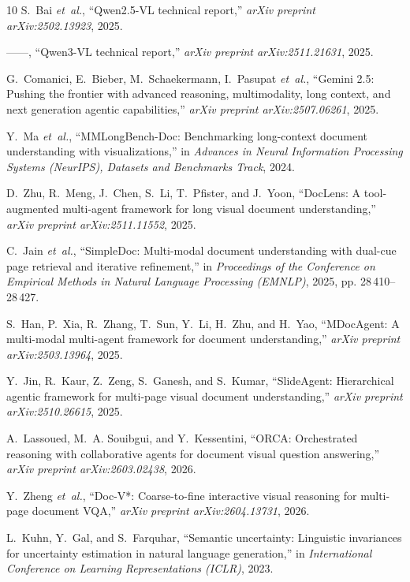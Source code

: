 \documentclass[pdflatex,sn-basic]{sn-jnl}%
\theoremstyle{thmstyletwo}%
\begin{document}
\begin{thebibliography}{10}
S.~Bai \emph{et~al.}, ``{Qwen2.5-VL} technical report,'' \emph{arXiv preprint
  arXiv:2502.13923}, 2025.

------, ``{Qwen3-VL} technical report,'' \emph{arXiv preprint
  arXiv:2511.21631}, 2025.

G.~Comanici, E.~Bieber, M.~Schaekermann, I.~Pasupat \emph{et~al.}, ``Gemini
  2.5: Pushing the frontier with advanced reasoning, multimodality, long
  context, and next generation agentic capabilities,'' \emph{arXiv preprint
  arXiv:2507.06261}, 2025.

Y.~Ma \emph{et~al.}, ``{MMLongBench-Doc}: Benchmarking long-context document
  understanding with visualizations,'' in \emph{Advances in Neural Information
  Processing Systems (NeurIPS), Datasets and Benchmarks Track}, 2024.

D.~Zhu, R.~Meng, J.~Chen, S.~Li, T.~Pfister, and J.~Yoon, ``{DocLens}: A
  tool-augmented multi-agent framework for long visual document
  understanding,'' \emph{arXiv preprint arXiv:2511.11552}, 2025.

C.~Jain \emph{et~al.}, ``{SimpleDoc}: Multi-modal document understanding with
  dual-cue page retrieval and iterative refinement,'' in \emph{Proceedings of
  the Conference on Empirical Methods in Natural Language Processing (EMNLP)},
  2025, pp. 28\,410--28\,427.

S.~Han, P.~Xia, R.~Zhang, T.~Sun, Y.~Li, H.~Zhu, and H.~Yao, ``{MDocAgent}: A
  multi-modal multi-agent framework for document understanding,'' \emph{arXiv
  preprint arXiv:2503.13964}, 2025.

Y.~Jin, R.~Kaur, Z.~Zeng, S.~Ganesh, and S.~Kumar, ``{SlideAgent}: Hierarchical
  agentic framework for multi-page visual document understanding,'' \emph{arXiv
  preprint arXiv:2510.26615}, 2025.

A.~Lassoued, M.~A. Souibgui, and Y.~Kessentini, ``{ORCA}: Orchestrated
  reasoning with collaborative agents for document visual question answering,''
  \emph{arXiv preprint arXiv:2603.02438}, 2026.

Y.~Zheng \emph{et~al.}, ``{Doc-V*}: Coarse-to-fine interactive visual reasoning
  for multi-page document {VQA},'' \emph{arXiv preprint arXiv:2604.13731},
  2026.

L.~Kuhn, Y.~Gal, and S.~Farquhar, ``Semantic uncertainty: Linguistic
  invariances for uncertainty estimation in natural language generation,'' in
  \emph{International Conference on Learning Representations (ICLR)}, 2023.


\end{thebibliography}
\end{document}
